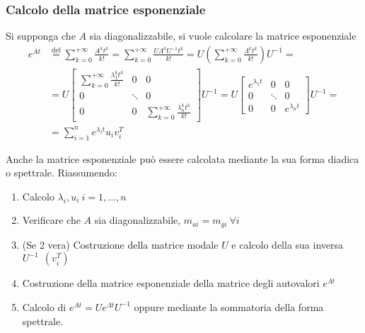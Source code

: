 \subsubsection{Calcolo della matrice esponenziale}
Si supponga che $A$ sia diagonalizzabile, si vuole calcolare la matrice
esponenziale
$$\begin{aligned}
e^{At} &\stackrel{\text{def}}{=} \sum_{k=0}^{+\infty} \frac{A^kt^k}{k!}=
\sum_{k=0}^{+\infty} \frac{U\Lambda^kU^{-1}t^k}{k!} =
U\left(\sum_{k=0}^{+\infty}\frac{\Lambda^kt^k}{k!}\right)U^{-1}= \\
       &= U\begin{bmatrix}
            \sum_{k=0}^{+\infty} \frac{\lambda_1^kt^k}{k!} & 0 & 0 \\
            0 & \ddots & 0 \\
            0 & 0 & \sum_{k=0}^{+\infty}\frac{\lambda_n^kt^k}{k!}
            \end{bmatrix}U^{-1} = U\begin{bmatrix}
                                    e^{\lambda_1t} & 0 & 0 \\
                                    0 & \ddots & 0 \\
                                    0 & 0 & e^{\lambda_n t}
                                    \end{bmatrix}U^{-1} = \\
        &= \sum_{i=1}^n e^{\lambda_i t} u_i v_i^T
\end{aligned}$$

Anche la matrice esponenziale può essere calcolata mediante la sua forma
diadica o spettrale.
Riassumendo:
\begin{enumerate}
 \item Calcolo $\lambda_i, u_i\ i=1,\ldots,n$
 \item Verificare che $A$ sia diagonalizzabile, $m_{ai} = m_{gi} \ \forall i$
 \item (Se 2 vera) Costruzione della matrice modale $U$ e calcolo della sua
 inversa $U^{-1}\ \ (v_i^T)$
 \item Costruzione della matrice esponenziale della matrice degli autovalori
$e^{\Lambda t}$
 \item Calcolo di $e^{A t} =  U e^{\Lambda t} U^{-1}$ oppure mediante la
 sommatoria della forma spettrale.
\end{enumerate}

\newpage
